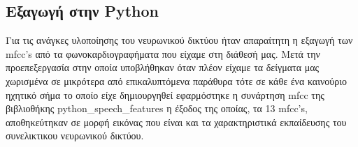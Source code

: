 \subsection{Eξαγωγή στην Python}
Για τις ανάγκες υλοποίησης του νευρωνικού δικτύου ήταν απαραίτητη η εξαγωγή των
mfcc's από τα φωνοκαρδιογραφήματα  που είχαμε στη διάθεσή μας. Μετά την
προεπεξεργασία στην οποία υποβλήθηκαν όταν πλέον είχαμε τα δείγματα μας χωρισμένα
σε μικρότερα από επικαλυπτόμενα παράθυρα τότε σε κάθε ένα καινούριο ηχητικό σήμα
το οποίο είχε δημιουργηθεί εφαρμόστηκε η συνάρτηση mfcc της βιβλιοθήκης
python_speech_features η έξοδος της οποίας, τα 13 mfcc's, αποθηκεύτηκαν σε μορφή
εικόνας που είναι και τα χαρακτηριστικά εκπαίδευσης  του συνελικτικου
νευρωνικού δικτύου.